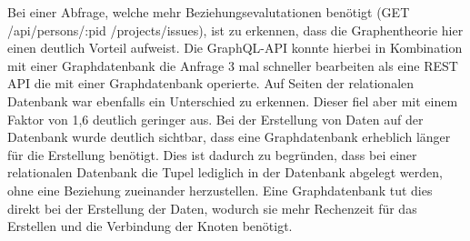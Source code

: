 \newline
\noindent
Bei einer Abfrage, welche mehr Beziehungsevalutationen benötigt  (GET /api/persons/:pid /projects/issues), ist zu erkennen, dass die Graphentheorie hier einen deutlich Vorteil aufweist. Die GraphQL-API konnte hierbei in Kombination mit einer Graphdatenbank die Anfrage 3 mal schneller bearbeiten als eine REST API die mit einer Graphdatenbank operierte. Auf Seiten der relationalen Datenbank war ebenfalls ein Unterschied zu erkennen. Dieser fiel aber mit einem Faktor von 1,6 deutlich geringer aus.
\newline
\noindent
Bei der Erstellung von Daten auf der Datenbank wurde deutlich sichtbar, dass eine Graphdatenbank erheblich länger für die Erstellung benötigt. Dies ist dadurch zu begründen, dass bei einer relationalen Datenbank die Tupel lediglich in der Datenbank abgelegt werden, ohne eine Beziehung zueinander herzustellen. Eine Graphdatenbank tut dies direkt bei der Erstellung der Daten, wodurch sie mehr Rechenzeit für das Erstellen und die Verbindung der Knoten benötigt. \citep{constantinov2015running}

